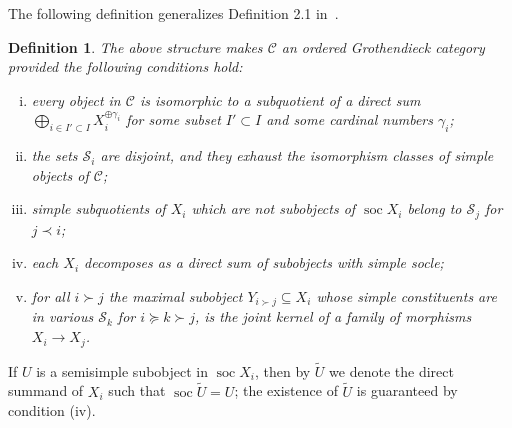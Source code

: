 \documentclass[11pt]{article}
\theoremstyle{plain}
\theoremstyle{nonumberplain}
\theoremstyle{plain}
\newtheorem{definition}[lemma]{Definition}
\theoremstyle{nonumberplain}
\newcommand\cC{\mathcal C}
\newcommand\cS{\mathcal S}
\DeclareMathOperator{\soc}{\mathrm{soc}}
\begin{document}
{The} following definition generalizes Definition 2.1 in~\cite{us}.
\begin{definition}\label{def.ordered}
  The above structure makes $\cC$ an {\it ordered Grothendieck
    category} provided the following conditions hold{{:}}
  \begin{enumerate}[(i)]
  \item every object in $\cC$ is isomorphic to a subquotient of a
    {direct} sum
    $\bigoplus\limits_{ i \in I'\subset I}X_i^{\oplus \gamma_i}$ {for
      some subset $I'\subset I$ and some cardinal numbers $\gamma_i$};
  \item the sets $\cS_i$ are disjoint, and they exhaust the
    isomorphism classes of simple objects of $\cC$;
    \item simple subquotients of $X_i$ which are not subobjects of $\soc X_i$ belong to $\cS_j$ for $j\prec i$;
    \item each $X_i$ decomposes as a direct sum of subobjects with simple socle;
    \item for all $i{{\succ}}j$ the maximal subobject
      $Y_{i{{\succ}}j}\subseteq X_i$ whose simple constituents are in
      various $\cS_k$ {for} $i{{\succeq}} k{{\succ}}j$, is the joint
      kernel of a family of morphisms $X_i\to X_j$.
  \end{enumerate}
\end{definition}

If $U$ is a semisimple subobject in $\soc X_i$, then by $\widetilde{U}$ we
denote the direct summand of $X_i$ such that $\soc \widetilde{U}=U$;
the existence of $\widetilde{U}$ is guaranteed by condition (iv).

%
\end{document}

